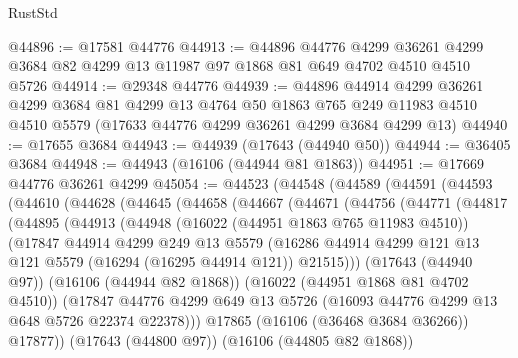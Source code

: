\begin{lexlean}{RustStd}
\begin{coremodule}
@44896 := @17581 @44776
@44913 := @44896
    @44776
    @4299
    @36261
    @4299
    @3684
    @82
    @4299
    @13
    @11987
    @97
    @1868
    @81
    @649
    @4702
    @4510
    @4510
    @5726
@44914 := @29348 @44776
@44939 := @44896
    @44914
    @4299
    @36261
    @4299
    @3684
    @81
    @4299
    @13
    @4764
    @50
    @1863
    @765
    @249
    @11983
    @4510
    @4510
    @5579
    (@17633 @44776 @4299 @36261 @4299 @3684 @4299 @13)
@44940 := @17655 @3684
@44943 := @44939 (@17643 (@44940 @50))
@44944 := @36405 @3684
@44948 := @44943 (@16106 (@44944 @81 @1863))
@44951 := @17669 @44776 @36261 @4299
@45054 := @44523
    (@44548
      (@44589
        (@44591
          (@44593
            (@44610
              (@44628
                (@44645
                  (@44658
                    (@44667
                      (@44671
                        (@44756
                          (@44771
                            (@44817
                              (@44895
                                (@44913
                                  (@44948
                                    (@16022 (@44951 @1863 @765 @11983 @4510))
                                    (@17847
                                      @44914
                                      @4299
                                      @249
                                      @13
                                      @5579
                                      (@16286
                                        @44914
                                        @4299
                                        @121
                                        @13
                                        @121
                                        @5579
                                        (@16294 (@16295 @44914 @121))
                                        @21515)))
                                  (@17643 (@44940 @97))
                                  (@16106 (@44944 @82 @1868))
                                  (@16022 (@44951 @1868 @81 @4702 @4510))
                                  (@17847
                                    @44776
                                    @4299
                                    @649
                                    @13
                                    @5726
                                    (@16093 @44776 @4299 @13 @648 @5726 @22374 @22378)))
                                @17865
                                (@16106 (@36468 @3684 @36266))
                                @17877))
                            (@17643 (@44800 @97))
                            (@16106 (@44805 @82 @1868))

\end{coremodule}
\end{lexlean}
